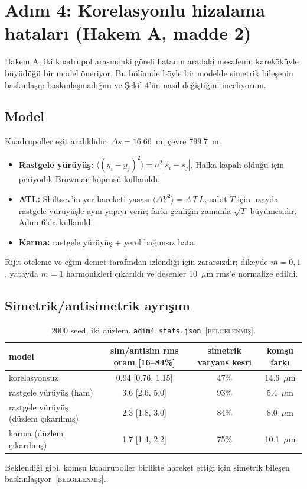 \documentclass[11pt,a4paper]{article}
\newcommand{\kod}[1]{{\XeTeXinterchartokenstate=0\texttt{#1}}}
\newcommand{\BEL}{\textsc{[belgelenmiş]}}
\begin{document}
\section{Adım 4: Korelasyonlu hizalama hataları (Hakem A, madde 2)}

Hakem A, iki kuadrupol arasındaki göreli hatanın aradaki mesafenin kareköküyle büyüdüğü bir model
öneriyor. Bu bölümde böyle bir modelde simetrik bileşenin baskınlaşıp baskınlaşmadığını ve Şekil 4'ün
nasıl değiştiğini inceliyorum.

\subsection{Model}
Kuadrupoller eşit aralıklıdır: $\Delta s=16.66$~m, çevre 799.7~m.
\begin{itemize}
\item \textbf{Rastgele yürüyüş:} $\langle(y_i-y_j)^2\rangle=a^2|s_i-s_j|$. Halka kapalı olduğu için
periyodik Brownian köprüsü kullanıldı.
\item \textbf{ATL:} Shiltsev'in yer hareketi yasası $\langle\Delta Y^2\rangle=A\,T\,L$, sabit $T$ için
uzayda rastgele yürüyüşle aynı yapıyı verir; farkı genliğin zamanla $\sqrt{T}$ büyümesidir. Adım 6'da
kullanıldı.
\item \textbf{Karma:} rastgele yürüyüş + yerel bağımsız hata.
\end{itemize}
Rijit öteleme ve eğim demet tarafından izlendiği için zararsızdır; dikeyde $m=0,1$, yatayda $m=1$
harmonikleri çıkarıldı ve desenler 10~$\mu$m rms'e normalize edildi.

\subsection{Simetrik/antisimetrik ayrışım}
\begin{table}[H]\centering\small
\caption{2000 seed, iki düzlem. \kod{adim4\_stats.json}~\BEL.}
\footnotesize
\begin{tabular}{lccc}
\toprule
model & sim/antisim rms oranı [16--84\%] & simetrik varyans kesri & komşu farkı \\
\midrule
korelasyonsuz & 0.94 [0.76, 1.15] & 47\% & 14.6~$\mu$m \\
rastgele yürüyüş (ham) & 3.6 [2.6, 5.0] & 93\% & 5.4~$\mu$m \\
rastgele yürüyüş (düzlem çıkarılmış) & 2.3 [1.8, 3.0] & 84\% & 8.0~$\mu$m \\
karma (düzlem çıkarılmış) & 1.7 [1.4, 2.2] & 75\% & 10.1~$\mu$m \\
\bottomrule
\end{tabular}
\end{table}
Beklendiği gibi, komşu kuadrupoller birlikte hareket ettiği için simetrik bileşen baskınlaşıyor~\BEL.
\end{document}
